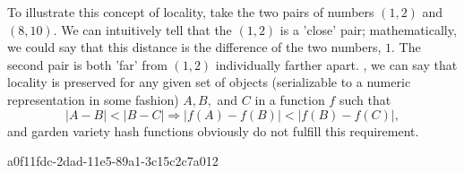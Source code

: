 \documentclass[12pt]{article}
\begin{document}
\par To illustrate this concept of locality, take the two pairs of numbers $(1,2)$ and $(8,10)$. We can intuitively tell that the $(1,2)$ is a 'close' pair; mathematically, we could say that this distance is the difference of the two numbers, $1$. The second pair is both 'far' from $(1,2)$ individually farther apart. , we can say that locality is preserved for any given set of objects (serializable to a numeric representation in some fashion) $A,B,$ and $C$ in a function $f$ such that
\begin{equation}
|A-B| < |B-C| \Rightarrow |f(A)-f(B)| < |f(B) - f(C)|,
\end{equation}
and garden variety hash functions obviously do not fulfill this requirement.

\printbibliography
a0f11fdc-2dad-11e5-89a1-3c15c2c7a012
\end{document}
